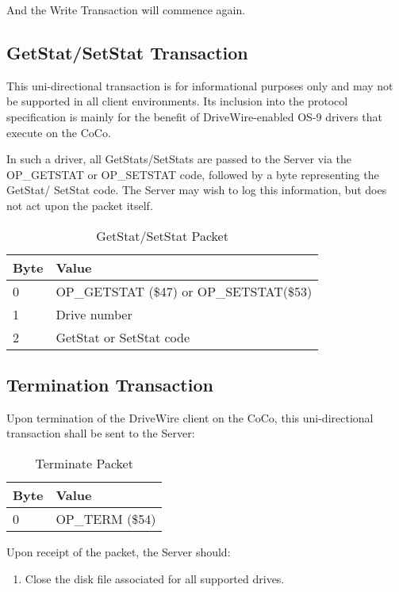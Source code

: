 \documentclass{article}
\begin{document}
And the Write Transaction will commence again.

\subsection{GetStat/SetStat Transaction}
This uni-directional transaction is for informational purposes only and may not be supported in all client environments. Its inclusion into the protocol specification is mainly for the benefit of DriveWire-enabled OS-9 drivers that execute on the CoCo.

In such a driver, all GetStats/SetStats are passed to the Server via the OP\_GETSTAT or OP\_SETSTAT code, followed by a byte representing the GetStat/ SetStat code. The Server may wish to log this information, but does not act upon the packet itself.

\begin{table}[ht]
\caption{GetStat/SetStat Packet}
\begin{center}
\begin{tabular}{|ll|}
\hline
Byte & Value \\ \hline
0 & OP\_GETSTAT (\$47) or OP\_SETSTAT(\$53) \\
1 & Drive number \\
2 & GetStat or SetStat code \\
\hline
\end{tabular}
\end{center}
\end{table}

\subsection{Termination Transaction}
Upon termination of the DriveWire client on the CoCo, this uni-directional transaction shall be sent to the Server:

\begin{table}[ht]
\caption{Terminate Packet}
\begin{center}
\begin{tabular}{|ll|}
\hline
Byte & Value \\ \hline
0 & OP\_TERM (\$54) \\
\hline
\end{tabular}
\end{center}
\end{table}

Upon receipt of the packet, the Server should:

\begin{enumerate}
\item Close the disk file associated for all supported drives.
\end{enumerate}
\end{document}
